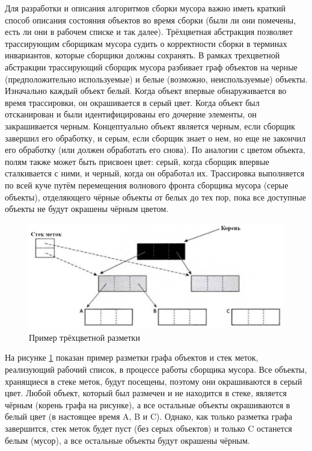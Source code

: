 Для разработки и описания алгоритмов сборки мусора важно иметь краткий способ описания состояния объектов во время сборки (были ли они помечены, есть ли они в рабочем списке и так далее). Трёхцветная абстракция позволяет трассирующим сборщикам мусора судить о корректности сборки в терминах инвариантов, которые сборщики должны сохранять. В рамках трехцветной абстракции трассирующий сборщик мусора разбивает граф объектов на черные (предположительно используемые) и белые (возможно, неиспользуемые) объекты. Изначально каждый объект белый. Когда объект впервые обнаруживается во время трассировки, он окрашивается в серый цвет. Когда объект был отсканирован и были идентифицированы его дочерние элементы, он закрашивается черным. Концептуально объект является черным, если сборщик завершил его обработку, и серым, если сборщик знает о нем, но еще не закончил его обработку (или должен обработать его снова). По аналогии с цветом объекта, полям также может быть присвоен цвет: серый, когда сборщик впервые сталкивается с ними, и черный, когда он обработал их. Трассировка выполняется по всей куче путём перемещения волнового фронта сборщика мусора (серые объекты), отделяющего чёрные объекты от белых до тех пор, пока все доступные объекты не будут окрашены чёрным цветом. \cite{handbook}

\begin{figure}[H]
	\centering
	\includegraphics[width=\textwidth]{assets/tricolor.png}
	\caption{Пример трёхцветной разметки}
	\label{fig:tricolor}
\end{figure}

На рисунке \ref{fig:tricolor} показан пример разметки графа объектов и стек меток, реализующий рабочий список, в процессе работы сборщика мусора. Все объекты, хранящиеся в стеке меток, будут посещены, поэтому они окрашиваются в серый цвет. Любой объект, который был размечен и не находится в стеке, является чёрным (корень графа на рисунке), а все остальные объекты окрашиваются в белый цвет (в настоящее время A, B и C). Однако, как только разметка графа завершится, стек меток будет пуст (без серых объектов) и только C останется белым (мусор), а все остальные объекты будут окрашены чёрным.

